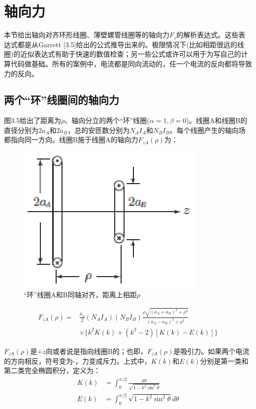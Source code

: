 \section{轴向力}
本节给出轴向对齐环形线圈、薄壁螺管线圈等的轴向力$F_z$的解析表达式。这些表达式都是从Garrett [3.5]给出的公式推导出来的。极限情况下(比如相距很远的线圈)的近似表达式有助于快速的数值检查；另一些公式或许可以用于为写自己的计算代码做基础。所有的案例中，电流都是同向流动的，任一个电流的反向都将导致力的反向。

\subsection{两个“环”线圈间的轴向力}
图3.5给出了距离为$\rho$、轴向分立的两个“环”线圈($\alpha=1,\beta=0$)。线圈A和线圈B的直径分别为$2a_A$和$2a_B$，总的安匝数分别为$N_A I_A$和$N_B I_B$。每个线圈产生的轴向场都指向同一方向。线圈B施于线圈A的轴向力$F_{zA}(\rho)$为：
\begin{figure}[htbp]
	\centering
	\includegraphics[scale=1]{chpt3/figs/fig3.5.eps}
	\caption{“环”线圈A和B同轴对齐，距离上相距$\rho$}
\end{figure}

\begin{equation}
\begin{split}
  F_{zA}(\rho)=&\frac{\mu_0}{2}(N_A I_A)(N_B I_B)\frac{\rho\sqrt{(a_A+a_B)^2+\rho^2}}{(a_A-a_B)^2+\rho^2}\\
  &\times\{k^2 K(k)+(k^2-2)[K(k)-E(k)]\}
\end{split}
\end{equation}

$F_{zA}(\rho)$是$+z$向或者说是指向线圈B的；也即，$F_{zA}(\rho)$是吸引力。如果两个电流的方向相反，符号变为-，力变成斥力。上式中，$K(k)$和$E(k)$分别是第一类和第二类完全椭圆积分，定义为：
\begin{subequations}
	\begin{align}
  K(k) &= \int_{0}^{\pi/2} \frac{d\theta}{\sqrt{1-k^2\sin^2\theta}} \\
  E(k)&= \int_{0}^{\pi/2}\sqrt{1-k^2 \sin^2\theta}d\theta
  \end{align}
\end{subequations}

